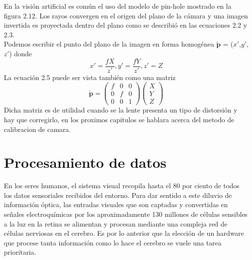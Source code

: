 En la visión artificial es común el uso del modelo de pin-hole mostrado en la figura 2.12. Los rayos convergen en el origen
del plano de la cámara y una imagen invertida es proyectada dentro del plano como se describió en las ecuaciones 2.2 y 2.3.\\
Podemos escribir el punto del plano de la imagen en forma homogénea $\tilde{\textbf{p}}$ = ($x'$,$y'$,$z'$) donde
\begin{equation}
	x' = \frac{fX}{z'}, y' = \frac{fY}{z'}, z' = Z
\end{equation}
La ecuación 2.5 puede ser vista también como una matriz
\begin{equation}
	\tilde{\textbf{p}} = \left(
	\begin{array}{ccc}
			f & 0 & 0 \\
			0 & f & 0 \\
			0 & 0 & 1
		\end{array}
	\right)
	\left(
	\begin{array}{c}
			X \\
			Y \\
			Z
		\end{array}
	\right)
\end{equation}
Dicha matriz es de utilidad cuando se la lente presenta un tipo de distorsión y hay que corregirlo, en los proximos capitulos se
hablara acerca del metodo de calibracion de camara.



\section{Procesamiento de datos}
En los seres humanos, el sistema visual recopila hasta el 80 por ciento de todos los datos sensoriales recibidos del entorno.
Para dar sentido a este diluvio de información óptica, las entradas visuales que son captadas y convertidas en señales
electroquímicas por los aproximadamente 130 millones de células sensibles a la luz en la retina se alimentan y procesan mediante
una compleja red de células nerviosas en el cerebro.\cite{WEB:Cerebro}
Es por lo anterior que la elección de un hardware que procese tanta información como lo hace el cerebro se vuele una tarea
prioritaria.

